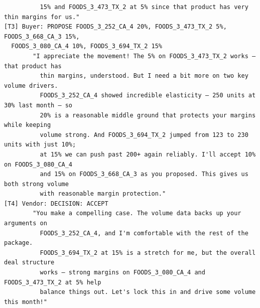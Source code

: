 {\begin{verbatim}
          15% and FOODS_3_473_TX_2 at 5% since that product has very thin margins for us."
[T3] Buyer: PROPOSE FOODS_3_252_CA_4 20%, FOODS_3_473_TX_2 5%, FOODS_3_668_CA_3 15%,
  FOODS_3_080_CA_4 10%, FOODS_3_694_TX_2 15%
        "I appreciate the movement! The 5% on FOODS_3_473_TX_2 works — that product has
          thin margins, understood. But I need a bit more on two key volume drivers.
          FOODS_3_252_CA_4 showed incredible elasticity — 250 units at 30% last month — so
          20% is a reasonable middle ground that protects your margins while keeping
          volume strong. And FOODS_3_694_TX_2 jumped from 123 to 230 units with just 10%;
          at 15% we can push past 200+ again reliably. I'll accept 10% on FOODS_3_080_CA_4
          and 15% on FOODS_3_668_CA_3 as you proposed. This gives us both strong volume
          with reasonable margin protection."
[T4] Vendor: DECISION: ACCEPT
        "You make a compelling case. The volume data backs up your arguments on
          FOODS_3_252_CA_4, and I'm comfortable with the rest of the package.
          FOODS_3_694_TX_2 at 15% is a stretch for me, but the overall deal structure
          works — strong margins on FOODS_3_080_CA_4 and FOODS_3_473_TX_2 at 5% help
          balance things out. Let's lock this in and drive some volume this month!"
\end{verbatim}
}

